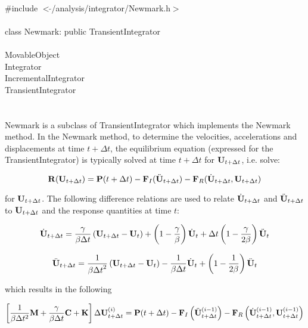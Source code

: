 
   \\
\indent \#include $<\tilde{ }$/analysis/integrator/Newmark.h$>$  \\

  \\
\indent class Newmark: public TransientIntegrator  \\

 \\
\indent MovableObject \\
\indent\indent Integrator \\
\indent\indent\indent IncrementalIntegrator \\
\indent\indent\indent\indent TransientIntegrator \\
\indent\indent\indent\indent{} \\

 \\ 
\indent Newmark is a subclass of TransientIntegrator which implements
the Newmark method. In the Newmark method, to determine the
velocities, accelerations and displacements at time $t + \Delta t$,
the equilibrium equation (expressed for the TransientIntegrator) is
typically solved at time $t + \Delta t$ for ${\bf U}_{t+\Delta t}$,
i.e. solve: 

\[ {\bf R} ({\bf U}_{t + \Delta t}) = {\bf P}(t + \Delta t) - {\bf F}_I(\ddot{\bf U}_{t+\Delta t})
- {\bf F}_R(\dot{\bf U}_{t + \Delta t},{\bf U}_{t + \Delta t}) \]

\noindent for ${\bf U}_{t+\Delta t}$. The following difference relations
are used to relate $\dot{\bf U}_{t + \Delta t}$ and $\ddot{\bf U}_{t + \Delta t}$ to
${\bf U}_{t + \Delta t}$ and the response quantities at time $t$:

\[
\dot {{\bf U}}_{t + \Delta t} = \frac{\gamma}{\beta \Delta t}
\left( {\bf U}_{t + \Delta t} - {\bf U}_t \right)
 + \left( 1 - \frac{\gamma}{\beta}\right) \dot {{\bf U}}_t + \Delta t \left(1
- \frac{\gamma}{2 \beta}\right) \ddot {{\bf U}}_t 
\]

\[
\ddot {{\bf U}}_{t + \Delta t} = \frac{1}{\beta {\Delta t}^2}
\left( {\bf U}_{t+\Delta t} - {\bf U}_t \right)
 - \frac{1}{\beta \Delta t} \dot {{\bf U}}_t + \left( 1 - \frac{1}{2
\beta} \right) \ddot {{\bf U}}_t 
\]

\noindent which  results in the following 

\[ \left[ \frac{1}{\beta \Delta t^2} {\bf M} + \frac{\gamma}{\beta \Delta t}
{\bf C} + {\bf K} \right] \Delta {\bf U}_{t + \Delta t}^{(i)} = {\bf P}(t + \Delta t) -
{\bf F}_I\left(\ddot{\bf U}_{t+\Delta  t}^{(i-1)}\right)
- {\bf F}_R\left(\dot{\bf U}_{t + \Delta t}^{(i-1)},{\bf U}_{t + \Delta t}^{(i-1)}\right) \]

